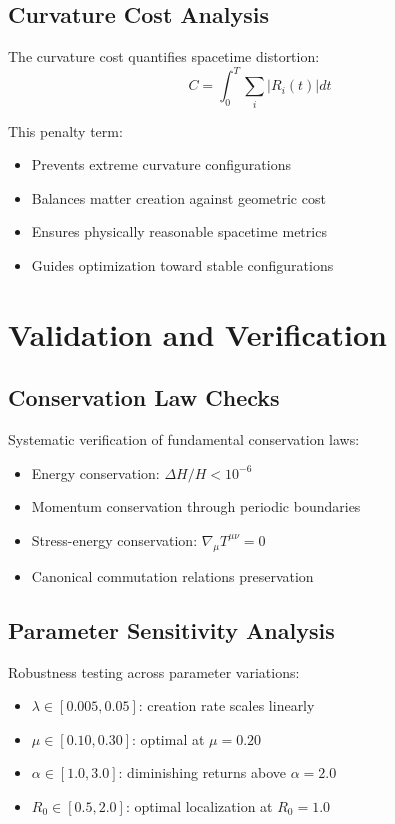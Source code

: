 \documentclass[11pt]{article}
\begin{document}
\subsection{Curvature Cost Analysis}

The curvature cost quantifies spacetime distortion:
\begin{equation}
C = \int_0^T \sum_i |R_i(t)| dt
\end{equation}

This penalty term:
\begin{itemize}
\item Prevents extreme curvature configurations
\item Balances matter creation against geometric cost
\item Ensures physically reasonable spacetime metrics
\item Guides optimization toward stable configurations
\end{itemize}

\section{Validation and Verification}

\subsection{Conservation Law Checks}

Systematic verification of fundamental conservation laws:
\begin{itemize}
\item Energy conservation: $\Delta H/H < 10^{-6}$
\item Momentum conservation through periodic boundaries
\item Stress-energy conservation: $\nabla_\mu T^{\mu\nu} = 0$
\item Canonical commutation relations preservation
\end{itemize}

\subsection{Parameter Sensitivity Analysis}

Robustness testing across parameter variations:
\begin{itemize}
\item $\lambda \in [0.005, 0.05]$: creation rate scales linearly
\item $\mu \in [0.10, 0.30]$: optimal at $\mu = 0.20$
\item $\alpha \in [1.0, 3.0]$: diminishing returns above $\alpha = 2.0$
\item $R_0 \in [0.5, 2.0]$: optimal localization at $R_0 = 1.0$
\end{itemize}
\end{document}
